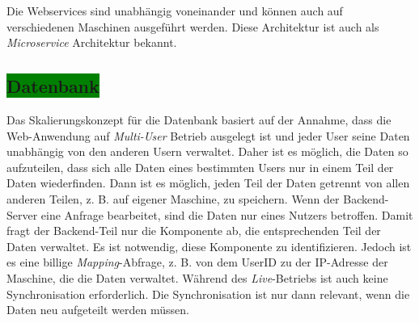 Die Webservices sind unabhängig voneinander und können auch auf verschiedenen Maschinen ausgeführt werden. Diese Architektur ist auch als \textit{Microservice} Architektur bekannt.

\subsection{\colorbox{green}{Datenbank}}

Das Skalierungskonzept für die Datenbank basiert auf der Annahme, dass die Web-Anwendung auf \textit{Multi-User} Betrieb ausgelegt ist und jeder User seine Daten unabhängig von den anderen Usern verwaltet. Daher ist es möglich, die Daten so aufzuteilen, dass sich alle Daten eines bestimmten Users nur in einem Teil der Daten wiederfinden. Dann ist es möglich, jeden Teil der Daten getrennt von allen anderen Teilen, z. B. auf eigener Maschine, zu speichern. Wenn der Backend-Server eine Anfrage bearbeitet, sind die Daten nur eines Nutzers betroffen. Damit fragt der Backend-Teil nur die Komponente ab, die entsprechenden Teil der Daten verwaltet. Es ist notwendig, diese Komponente zu identifizieren. Jedoch ist es eine billige \textit{Mapping}-Abfrage, z. B. von dem UserID zu der IP-Adresse der Maschine, die die Daten verwaltet. Während des \textit{Live}-Betriebs ist auch keine Synchronisation erforderlich. Die Synchronisation ist nur dann relevant, wenn die Daten neu aufgeteilt werden müssen.

